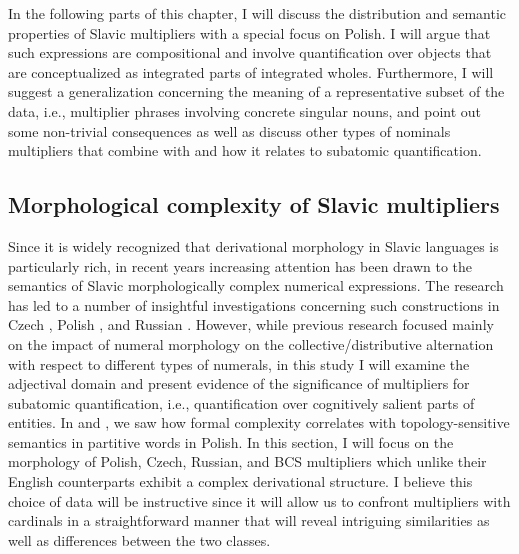 In the following parts of this chapter, I will discuss the distribution and semantic properties of Slavic multipliers with a special focus on Polish. I will argue that such expressions are compositional and involve quantification over objects that are conceptualized as integrated parts of integrated wholes. Furthermore, I will suggest a generalization concerning the meaning of a representative subset of the data, i.e., multiplier phrases involving concrete singular nouns, and point out some non-trivial consequences as well as discuss other types of nominals multipliers that combine with and how it relates to subatomic quantification.

\subsection{Morphological complexity of Slavic multipliers}\label{sec:morphological-complexity-of-slavic-multipliers}

Since it is widely recognized that derivational morphology in Slavic languages is particularly rich, in recent years increasing attention has been drawn to the semantics of Slavic morphologically complex numerical expressions. The research has led to a number of insightful investigations concerning such constructions in Czech \citep[e.g.,][]{docekal2012atoms,docekal2013numerals,docekal_wagiel2018event,grimm_docekal-toappear-counting}, Polish \citep[e.g.,][]{wagiel2014boys,wagiel2015sums,wagiel2020entities,wagiel2020several,wagiel-toappear-grammatical}, and Russian \citep[e.g.,][]{khrizman2015cardinal}. However, while previous research focused mainly on the impact of numeral morphology on the collective/distributive alternation with respect to different types of numerals, in this study I will examine the adjectival domain and present evidence of the significance of multipliers for subatomic quantification, i.e., quantification over cognitively salient parts of entities. In  and , we saw how formal complexity correlates with topology-sensitive semantics in partitive words in Polish. In this section, I will focus on the morphology of Polish, Czech, Russian, and BCS multipliers which unlike their English counterparts exhibit a complex derivational structure. I believe this choice of data will be instructive since it will allow us to confront multipliers with cardinals in a straightforward manner that will reveal intriguing similarities as well as differences between the two classes. 

